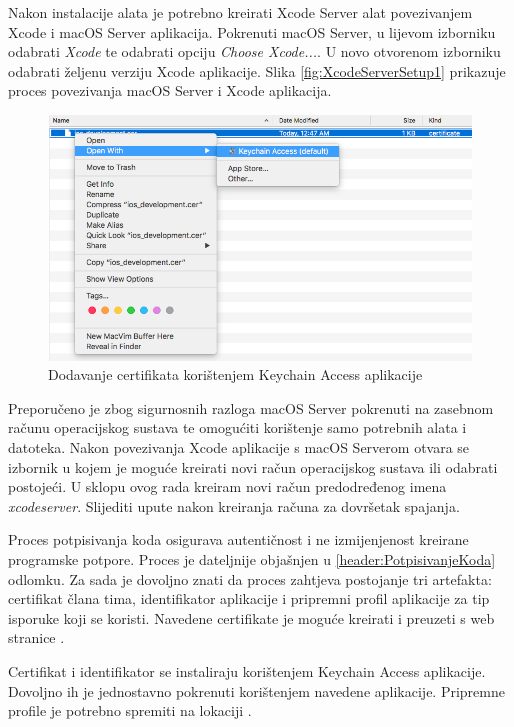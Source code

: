 \documentclass[times, utf8, diplomski, numeric]{fer}
\begin{document}
Nakon instalacije alata je potrebno kreirati Xcode Server alat povezivanjem Xcode i macOS Server aplikacija. Pokrenuti macOS Server, u lijevom izborniku odabrati \textit{Xcode} te odabrati opciju \textit{Choose Xcode...}. U novo otvorenom izborniku odabrati željenu verziju Xcode aplikacije. Slika \ref{fig:XcodeServerSetup1} prikazuje proces povezivanja macOS Server i Xcode aplikacija.

\begin{figure}[b!]
\centering
\includegraphics[scale=0.4]{DodavanjeCertifikata}
\caption{Dodavanje certifikata korištenjem Keychain Access aplikacije}
\label{fig:DodavanjeCertifikata}
\end{figure}

Preporučeno je zbog sigurnosnih razloga macOS Server pokrenuti na zasebnom računu operacijskog sustava te omogućiti korištenje samo potrebnih alata i datoteka. Nakon povezivanja Xcode aplikacije s macOS Serverom otvara se izbornik u kojem je moguće kreirati novi račun operacijskog sustava ili odabrati postojeći. U sklopu ovog rada kreiram novi račun predodređenog imena \textit{xcodeserver}. Slijediti upute nakon kreiranja računa za dovršetak spajanja.

Proces potpisivanja koda osigurava autentičnost i ne izmijenjenost kreirane programske potpore. Proces je dateljnije objašnjen u \ref{header:PotpisivanjeKoda} odlomku. Za sada je dovoljno znati da proces zahtjeva postojanje tri artefakta: certifikat člana tima, identifikator aplikacije i pripremni profil aplikacije za tip isporuke koji se koristi. Navedene certifikate je moguće kreirati i preuzeti s web stranice .

Certifikat i identifikator se instaliraju korištenjem Keychain Access aplikacije. Dovoljno ih je jednostavno pokrenuti korištenjem navedene aplikacije. Pripremne profile je potrebno spremiti na lokaciji .
\end{document}
